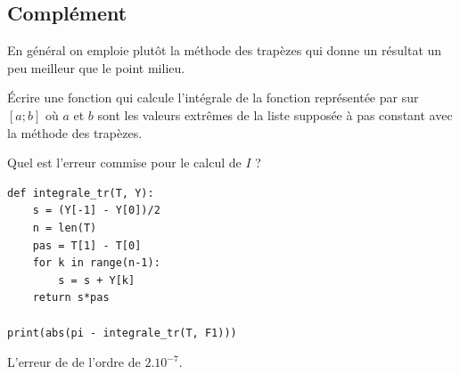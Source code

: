 \subsection{Complément}
En général on emploie plutôt la méthode des trapèzes qui donne un résultat un peu meilleur que le point milieu.
\begin{Exercise}\it

Écrire une fonction  qui calcule l'intégrale de la fonction représentée par  sur $[a; b]$ où $a$ et $b$ sont les valeurs extrêmes de la liste  supposée à pas constant avec la méthode des trapèzes.

Quel est l'erreur commise pour le calcul de $I$ ?

\end{Exercise}
\begin{Answer}
\begin{lstlisting}
def integrale_tr(T, Y):
    s = (Y[-1] - Y[0])/2
    n = len(T)
    pas = T[1] - T[0]
    for k in range(n-1):
        s = s + Y[k]
    return s*pas

print(abs(pi - integrale_tr(T, F1)))
\end{lstlisting}


L'erreur de de l'ordre de $2.10^{-7}$.
\end{Answer}





